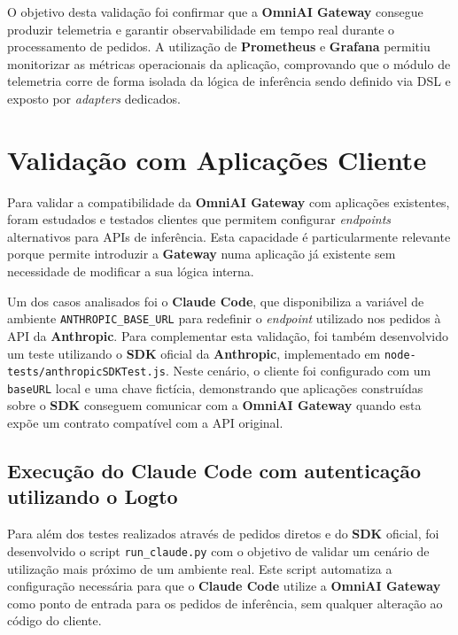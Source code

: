     O objetivo desta validação foi confirmar que a \textbf{OmniAI Gateway} consegue produzir telemetria e garantir observabilidade em tempo real durante o processamento de pedidos. A utilização de \textbf{Prometheus} \cite{prometheus_ref} e \textbf{Grafana} \cite{grafana_ref} permitiu monitorizar as métricas operacionais da aplicação, comprovando que o módulo de telemetria corre de forma isolada da lógica de inferência sendo definido via DSL e exposto por \textit{adapters} dedicados.


    \section{Validação com Aplicações Cliente}

    Para validar a compatibilidade da \textbf{OmniAI Gateway} com aplicações existentes, foram estudados e testados clientes que permitem configurar \textit{endpoints} alternativos para APIs de inferência. Esta capacidade é particularmente relevante porque permite introduzir a \textbf{Gateway} numa aplicação já existente sem necessidade de modificar a sua lógica interna.

    Um dos casos analisados foi o \textbf{Claude Code}, que disponibiliza a variável de ambiente \texttt{ANTHROPIC\_\allowbreak BASE\_\allowbreak URL} para redefinir o \textit{endpoint} utilizado nos pedidos à API da \textbf{Anthropic}. Para complementar esta validação, foi também desenvolvido um teste utilizando o \textbf{SDK} oficial da \textbf{Anthropic}, implementado em \texttt{node-tests/anthropicSDKTest.js}. Neste cenário, o cliente foi configurado com um \texttt{baseURL} local e uma chave fictícia, demonstrando que aplicações construídas sobre o \textbf{SDK} conseguem comunicar com a \textbf{OmniAI Gateway} quando esta expõe um contrato compatível com a API original.

    \subsection{Execução do Claude Code com autenticação utilizando o Logto}

    Para além dos testes realizados através de pedidos diretos e do \textbf{SDK} oficial, foi desenvolvido o script \texttt{run\_claude.py} com o objetivo de validar um cenário de utilização mais próximo de um ambiente real. Este script automatiza a configuração necessária para que o \textbf{Claude Code} utilize a \textbf{OmniAI Gateway} como ponto de entrada para os pedidos de inferência, sem qualquer alteração ao código do cliente.


